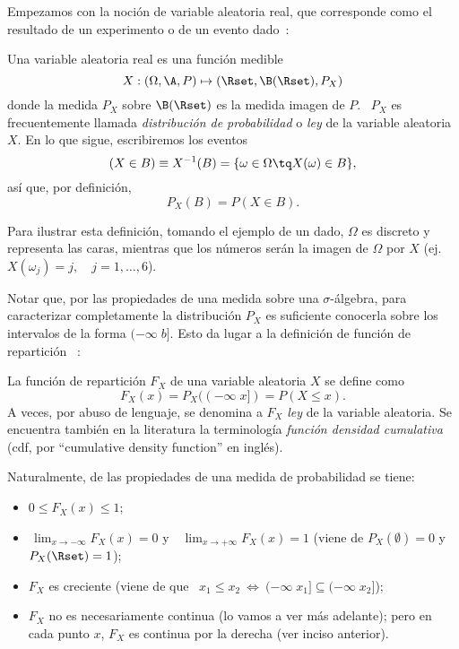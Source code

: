 Empezamos con  la noci\'on de variable  aleatoria real, que  corresponde como el
resultado de un experimento o de un evento dado~\cite{AshDol99, AthLah06, Coh13,
  Bre88}:
%
\begin{definicion}
\label{Def:MP:VariableAleatotiaReal}
%
  Una variable aleatoria real es una funci\'on medible
  \[
  X: (\Omega,\A,P) \mapsto (\Rset,\B(\Rset),P_X)
  \]
  donde la medida  $P_X$ sobre $\B(\Rset)$ es la medida imagen  de $P$.  \ $P_X$
  es frecuentemente llamada {\it distribuci\'on  de probabilidad} o {\it ley} de
  la variable aleatoria $X$. En lo que sigue, escribiremos  los eventos
  \[
  (X \in B) \equiv X^{-1}(B) = \{ \omega \in \Omega \tq X(\omega) \in B \},
  \]
  as\'i que, por definici\'on,
  \[
  P_X(B) = P(X \in B).
  \]
\end{definicion}
%
Para  ilustrar esta definici\'on,  tomando el  ejemplo de  un dado,  $\Omega$ es
discreto y representa las caras,  mientras que los n\'umeros    ser\'an  la  imagen  de  $\Omega$  por  $X$
(ej. $X(\omega_j) = j, \quad j = 1, \ldots , 6$).

Notar que, por las propiedades  de una medida sobre una $\sigma$-\'algebra, para
caracterizar completamente la distribuci\'on $P_X$ es suficiente conocerla sobre
los intervalos de la forma $(-\infty \; b]$.  Esto da lugar a la definici\'on de
funci\'on de repartici\'on ~\cite{AshDol99, AthLah06, Coh13, Bre88, HogMck13}:
%
\begin{definicion}
\label{Def:MP:FuncionReparticion}
%
La funci\'on de repartici\'on $F_X$ de una variable aleatoria $X$ se define como
  \[
  F_X(x) = P_X((-\infty \; x]) = P(X \le x).
  \]
  A veces, por abuso  de lenguaje, se denomina a $F_X$ {\it  ley} de la variable
  aleatoria.  Se encuentra  tambi\'en en  la literatura  la  terminolog\'ia {\it
    funci\'on densidad cumulativa} (cdf,  por ``cumulative density function'' en
  ingl\'es).
\end{definicion}
%
Naturalmente, de las propiedades de una medida de probabilidad se tiene:
%
\begin{itemize}
\item $0 \le F_X(x) \le 1$;
%
\item $\displaystyle \, \lim_{x \to -\infty} F_X(x) = 0$ y \ $\displaystyle \,
  \lim_{x \to +\infty} F_X(x) = 1$  (viene de $P_X(\emptyset) = 0$ y $P_X(\Rset)
  = 1$);
%
\item $F_X$ es creciente \big(viene de  que \ $x_1 \le x_2 \: \Leftrightarrow \:
  (-\infty \; x_1] \subseteq (-\infty \; x_2]$\big);
%
\item $F_X$ no es necesariamente continua  (lo vamos a ver m\'as adelante); pero
  en cada punto $x$, $F_X$ es continua por la derecha (ver inciso anterior).
\end{itemize}



